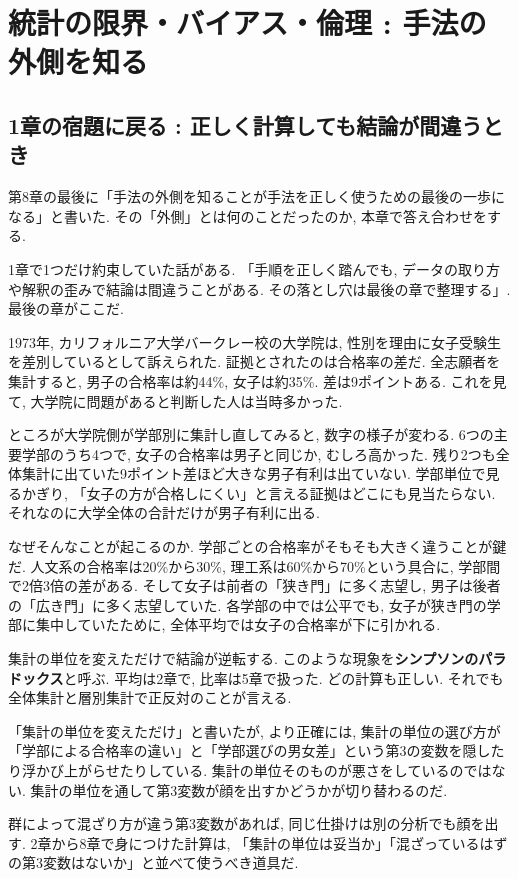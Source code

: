 ﻿\section{統計の限界・バイアス・倫理 : 手法の外側を知る}

\subsection{1章の宿題に戻る : 正しく計算しても結論が間違うとき}

第8章の最後に「手法の外側を知ることが手法を正しく使うための最後の一歩になる」と書いた. その「外側」とは何のことだったのか, 本章で答え合わせをする.

1章で1つだけ約束していた話がある. 「手順を正しく踏んでも, データの取り方や解釈の歪みで結論は間違うことがある. その落とし穴は最後の章で整理する」. 最後の章がここだ.

1973年, カリフォルニア大学バークレー校の大学院は, 性別を理由に女子受験生を差別しているとして訴えられた.
証拠とされたのは合格率の差だ. 全志願者を集計すると, 男子の合格率は約44\%, 女子は約35\%. 差は9ポイントある.
これを見て, 大学院に問題があると判断した人は当時多かった.

ところが大学院側が学部別に集計し直してみると, 数字の様子が変わる.
6つの主要学部のうち4つで, 女子の合格率は男子と同じか, むしろ高かった.
残り2つも全体集計に出ていた9ポイント差ほど大きな男子有利は出ていない.
学部単位で見るかぎり, 「女子の方が合格しにくい」と言える証拠はどこにも見当たらない.
それなのに大学全体の合計だけが男子有利に出る.

なぜそんなことが起こるのか.
学部ごとの合格率がそもそも大きく違うことが鍵だ.
人文系の合格率は20\%から30\%, 理工系は60\%から70\%という具合に, 学部間で2倍3倍の差がある.
そして女子は前者の「狭き門」に多く志望し, 男子は後者の「広き門」に多く志望していた.
各学部の中では公平でも, 女子が狭き門の学部に集中していたために, 全体平均では女子の合格率が下に引かれる.

集計の単位を変えただけで結論が逆転する. このような現象を\textbf{シンプソンのパラドックス}と呼ぶ.
平均は2章で, 比率は5章で扱った. どの計算も正しい.
それでも全体集計と層別集計で正反対のことが言える.

「集計の単位を変えただけ」と書いたが, より正確には, 集計の単位の選び方が「学部による合格率の違い」と「学部選びの男女差」という第3の変数を隠したり浮かび上がらせたりしている.
集計の単位そのものが悪さをしているのではない. 集計の単位を通して第3変数が顔を出すかどうかが切り替わるのだ.

群によって混ざり方が違う第3変数があれば, 同じ仕掛けは別の分析でも顔を出す.
2章から8章で身につけた計算は, 「集計の単位は妥当か」「混ざっているはずの第3変数はないか」と並べて使うべき道具だ.

